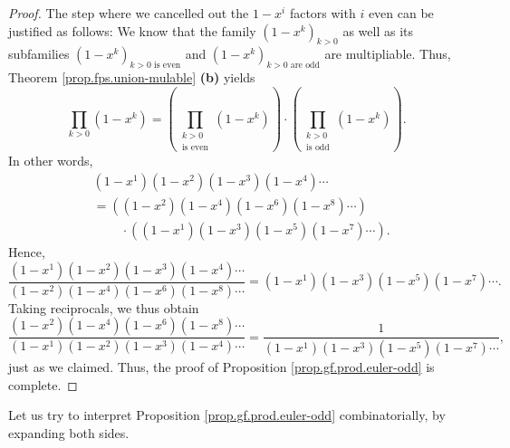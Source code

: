 \begin{proof}
The step where we cancelled out the $1-x^{i}$ factors with $i$ even can be
justified as follows: We know that the family $\left(  1-x^{k}\right)  _{k>0}$
as well as its subfamilies $\left(  1-x^{k}\right)  _{k>0\text{ is even}}$ and
$\left(  1-x^{k}\right)  _{k>0\text{ are odd}}$ are multipliable. Thus,
Theorem \ref{prop.fps.union-mulable} \textbf{(b)} yields%
\[
\prod_{k>0}\left(  1-x^{k}\right)  =\left(  \prod_{\substack{k>0\\\text{is
even}}}\left(  1-x^{k}\right)  \right)  \cdot\left(  \prod
_{\substack{k>0\\\text{is odd}}}\left(  1-x^{k}\right)  \right)  .
\]
In other words,%
\begin{align*}
&  \left(  1-x^{1}\right)  \left(  1-x^{2}\right)  \left(  1-x^{3}\right)
\left(  1-x^{4}\right)  \cdots\\
&  =\left(  \left(  1-x^{2}\right)  \left(  1-x^{4}\right)  \left(
1-x^{6}\right)  \left(  1-x^{8}\right)  \cdots\right) \\
&  \ \ \ \ \ \ \ \ \ \ \cdot\left(  \left(  1-x^{1}\right)  \left(
1-x^{3}\right)  \left(  1-x^{5}\right)  \left(  1-x^{7}\right)  \cdots\right)
.
\end{align*}
Hence,%
\[
\dfrac{\left(  1-x^{1}\right)  \left(  1-x^{2}\right)  \left(  1-x^{3}\right)
\left(  1-x^{4}\right)  \cdots}{\left(  1-x^{2}\right)  \left(  1-x^{4}%
\right)  \left(  1-x^{6}\right)  \left(  1-x^{8}\right)  \cdots}=\left(
1-x^{1}\right)  \left(  1-x^{3}\right)  \left(  1-x^{5}\right)  \left(
1-x^{7}\right)  \cdots.
\]
Taking reciprocals, we thus obtain%
\[
\dfrac{\left(  1-x^{2}\right)  \left(  1-x^{4}\right)  \left(  1-x^{6}\right)
\left(  1-x^{8}\right)  \cdots}{\left(  1-x^{1}\right)  \left(  1-x^{2}%
\right)  \left(  1-x^{3}\right)  \left(  1-x^{4}\right)  \cdots}=\dfrac
{1}{\left(  1-x^{1}\right)  \left(  1-x^{3}\right)  \left(  1-x^{5}\right)
\left(  1-x^{7}\right)  \cdots},
\]
just as we claimed. Thus, the proof of Proposition
\ref{prop.gf.prod.euler-odd} is complete.
\end{proof}

Let us try to interpret Proposition \ref{prop.gf.prod.euler-odd}
combinatorially, by expanding both sides.

